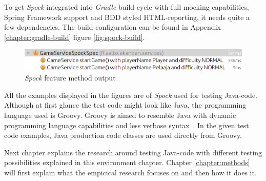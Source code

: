     To get \textit{Spock} integrated into \textit{Gradle} build cycle with full mocking capabilities, Spring Framework support and BDD styled HTML-reporting, it needs
    quite a few dependencies. The build configuration can be found in Appendix \ref{chapter:gradle-build} figure \ref{fig:spock-build}.

    \clearpage
    \begin{figure}[H]
      \begin{center}
        \begin{topbot}[style=mdstyle]
        \includegraphics[width=\textwidth]{images/spock-result.png}
        \end{topbot}
        \caption{\textit{Spock} feature method output}
        \label{fig:spock-result}
      \end{center}
    \end{figure}
    All the examples displayed in the figures are of \textit{Spock} used for testing Java-code. Although at first glance the test code might
    look like Java, the programming language used is Groovy. Groovy is aimed to resemble Java with dynamic programming language
    capabilities and less verbose syntax~\cite{kapelonis2016java}. In the given test code examples, Java production code classes are used directly
    from Groovy.

    Next chapter explains the research around testing Java-code with different testing possibilities explained in this environment
    chapter. Chapter \ref{chapter:methods} will first explain what the empicical research focuses on and then how it does it.

